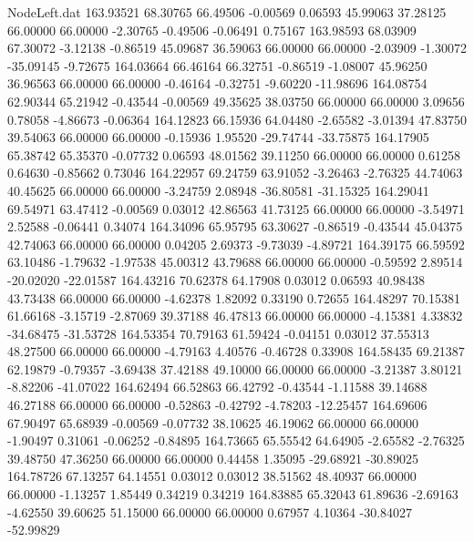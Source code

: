 \begin{filecontents}{NodeLeft.dat}
 163.93521   68.30765   66.49506    -0.00569    0.06593   45.99063   37.28125   66.00000   66.00000   -2.30765   -0.49506   -0.06491    0.75167
 163.98593   68.03909   67.30072    -3.12138   -0.86519   45.09687   36.59063   66.00000   66.00000   -2.03909   -1.30072  -35.09145   -9.72675
 164.03664   66.46164   66.32751    -0.86519   -1.08007   45.96250   36.96563   66.00000   66.00000   -0.46164   -0.32751   -9.60220  -11.98696
 164.08754   62.90344   65.21942    -0.43544   -0.00569   49.35625   38.03750   66.00000   66.00000    3.09656    0.78058   -4.86673   -0.06364
 164.12823   66.15936   64.04480    -2.65582   -3.01394   47.83750   39.54063   66.00000   66.00000   -0.15936    1.95520  -29.74744  -33.75875
 164.17905   65.38742   65.35370    -0.07732    0.06593   48.01562   39.11250   66.00000   66.00000    0.61258    0.64630   -0.85662    0.73046
 164.22957   69.24759   63.91052    -3.26463   -2.76325   44.74063   40.45625   66.00000   66.00000   -3.24759    2.08948  -36.80581  -31.15325
 164.29041   69.54971   63.47412    -0.00569    0.03012   42.86563   41.73125   66.00000   66.00000   -3.54971    2.52588   -0.06441    0.34074
 164.34096   65.95795   63.30627    -0.86519   -0.43544   45.04375   42.74063   66.00000   66.00000    0.04205    2.69373   -9.73039   -4.89721
 164.39175   66.59592   63.10486    -1.79632   -1.97538   45.00312   43.79688   66.00000   66.00000   -0.59592    2.89514  -20.02020  -22.01587
 164.43216   70.62378   64.17908     0.03012    0.06593   40.98438   43.73438   66.00000   66.00000   -4.62378    1.82092    0.33190    0.72655
 164.48297   70.15381   61.66168    -3.15719   -2.87069   39.37188   46.47813   66.00000   66.00000   -4.15381    4.33832  -34.68475  -31.53728
 164.53354   70.79163   61.59424    -0.04151    0.03012   37.55313   48.27500   66.00000   66.00000   -4.79163    4.40576   -0.46728    0.33908
 164.58435   69.21387   62.19879    -0.79357   -3.69438   37.42188   49.10000   66.00000   66.00000   -3.21387    3.80121   -8.82206  -41.07022
 164.62494   66.52863   66.42792    -0.43544   -1.11588   39.14688   46.27188   66.00000   66.00000   -0.52863   -0.42792   -4.78203  -12.25457
 164.69606   67.90497   65.68939    -0.00569   -0.07732   38.10625   46.19062   66.00000   66.00000   -1.90497    0.31061   -0.06252   -0.84895
 164.73665   65.55542   64.64905    -2.65582   -2.76325   39.48750   47.36250   66.00000   66.00000    0.44458    1.35095  -29.68921  -30.89025
 164.78726   67.13257   64.14551     0.03012    0.03012   38.51562   48.40937   66.00000   66.00000   -1.13257    1.85449    0.34219    0.34219
 164.83885   65.32043   61.89636    -2.69163   -4.62550   39.60625   51.15000   66.00000   66.00000    0.67957    4.10364  -30.84027  -52.99829

\end{filecontents}
